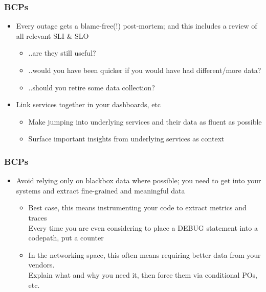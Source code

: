 \documentclass[aspectratio=169]{beamer}
\begin{document}

\begin{frame}
	\frametitle{BCPs}
	\begin{itemize}
		\item Every outage gets a blame-free(!) post-mortem; and this includes a review of all relevant SLI \& SLO
		\begin{itemize}
			\item ..are they still useful?
			\item ..would you have been quicker if you would have had different/more data?
			\item ..should you retire some data collection?
		\end{itemize}
		\item Link services together in your dashboards, etc
		\begin{itemize}
			\item Make jumping into underlying services and their data as fluent as possible
			\item Surface important insights from underlying services as context
		\end{itemize}
	\end{itemize}
\end{frame}

\begin{frame}
	\frametitle{BCPs}
	\begin{itemize}
		\item Avoid relying only on blackbox data where possible; you need to get into your systems and extract fine-grained and meaningful data
		\begin{itemize}
			\item Best case, this means instrumenting your code to extract metrics and traces\\
				Every time you are even considering to place a DEBUG statement into a codepath, put a counter
			\item In the networking space, this often means requiring better data from your vendors.\\
				Explain what and why you need it, then force them via conditional POs, etc.
		\end{itemize}
	\end{itemize}
\end{frame}
\end{document}
